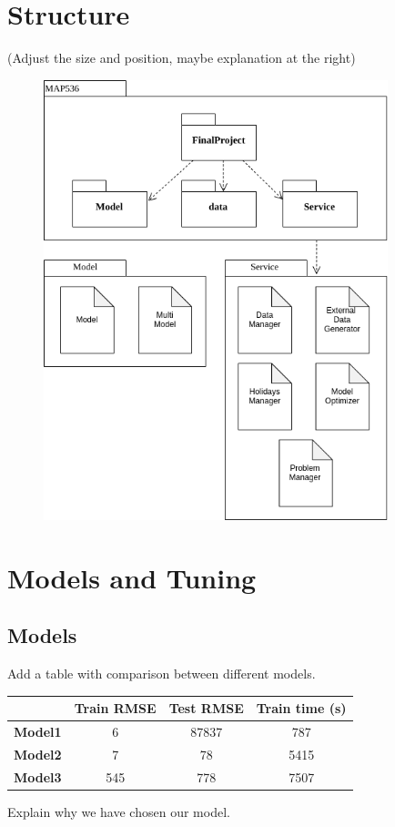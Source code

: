 \documentclass[a4paper,12pt,twoside]{article}
\begin{document}
\section{Structure}
(Adjust the size and position, maybe explanation at the right)
\begin{figure}[H]
	\includegraphics[width=100mm,scale=0.5]{UML.png}
\end{figure}

\section{Models and Tuning}
\subsection{Models}
Add a table with comparison between different models.
\begin{center}
	\begin{tabular}{||c || c c c||} 
		\hline
			 & Train RMSE & Test RMSE & Train time (s) \\ [0.5ex] 
		\hline\hline
		\textbf{Model1} & 6 & 87837 & 787 \\ 
		\hline
		\textbf{Model2} & 7 & 78 & 5415 \\
		\hline
		\textbf{Model3} & 545 & 778 & 7507 \\
		\hline
	\end{tabular}
\end{center}
Explain why we have chosen our model.
\end{document}
